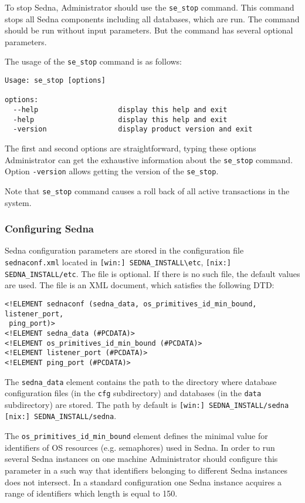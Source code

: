 \documentclass[a4paper,12pt]{article}
\begin{document}
To stop Sedna, Administrator should use the \verb!se_stop! command. This command stops all Sedna components including all databases, which are run. The command should be run without input parameters. But the command has several optional parameters.

The usage of the \verb!se_stop! command is as follows:

\begin{verbatim}
Usage: se_stop [options]

options:
  --help                   display this help and exit
  -help                    display this help and exit
  -version                 display product version and exit
\end{verbatim}
The first and second options are straightforward, typing these options Administrator can get the exhaustive information about the \verb!se_stop! command. Option \verb!-version! allows getting the version of the \verb!se_stop!.

Note that \verb!se_stop! command causes a roll back of all active transactions in the system.

\subsubsection{Configuring Sedna}
\label{sec:ConfigSedna}
Sedna configuration parameters are stored in the configuration file \verb!sednaconf.xml! located in
\verb![win:] SEDNA_INSTALL\etc!, \verb![nix:] SEDNA_INSTALL/etc!. The file is optional. If there is no such file, the default values are used.
The file is an XML document, which satisfies the following DTD:

\begin{verbatim}
<!ELEMENT sednaconf (sedna_data, os_primitives_id_min_bound, listener_port,
 ping_port)>
<!ELEMENT sedna_data (#PCDATA)>
<!ELEMENT os_primitives_id_min_bound (#PCDATA)>
<!ELEMENT listener_port (#PCDATA)>
<!ELEMENT ping_port (#PCDATA)>
\end{verbatim}

The \verb!sedna_data! element contains the path to the directory where 
database configuration files (in the \verb!cfg! subdirectory) and 
databases (in the \verb!data! subdirectory) are stored. The path by default is
\verb![win:] SEDNA_INSTALL/sedna! \verb![nix:] SEDNA_INSTALL/sedna!.

The \verb!os_primitives_id_min_bound! element defines the minimal value for identifiers of OS resources (e.g. semaphores) used in Sedna. In order to run several Sedna instances on one machine Administrator should configure this parameter in a such way that identifiers belonging to different Sedna instances does not intersect. In a standard configuration one Sedna instance acquires a range of identifiers which length is equal to 150.
\end{document}
